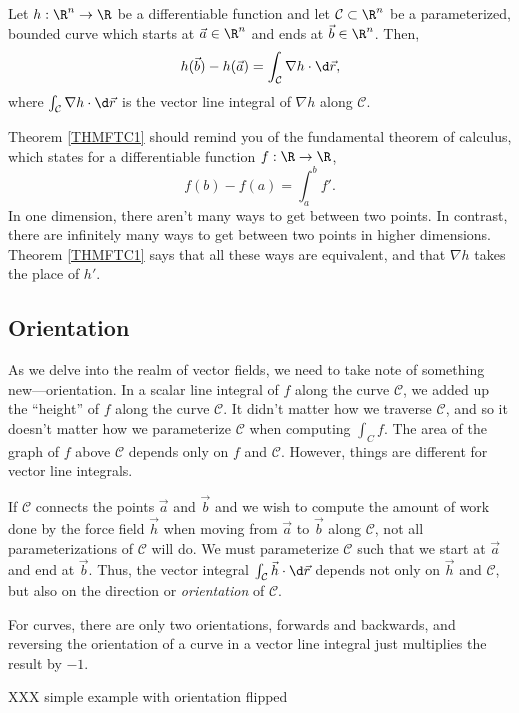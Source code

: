 \begin{theorem}
	\label{THMFTC1}
	Let $h:\R^n\to\R$ be a differentiable function and let
	$\mathcal C\subset \R^n$ be a parameterized, bounded curve 
	which starts at $\vec a\in\R^n$ and ends at $\vec b\in\R^n$.
	Then,
	\[
		h(\vec b)-h(\vec a) = \int_{\mathcal C} \nabla h\cdot \d\vec r,
	\]
	where $\int_{\mathcal C} \nabla h\cdot \d\vec r$ is the vector line
	integral of $\nabla h$ along $\mathcal C$.
\end{theorem}

Theorem \ref{THMFTC1} should remind you of the fundamental theorem of calculus,
which states for a differentiable function $f:\R\to\R$, 
\[
	f(b)-f(a) = \int_a^b f'.
\]
In one dimension, there aren't many ways to get between two points.  In
contrast, there are infinitely many ways to get between two points
in higher dimensions.  Theorem \ref{THMFTC1} says that all these ways
are equivalent, and that $\nabla h$ takes the place of $h'$.

\subsection{Orientation}

As we delve into the realm of vector fields, we need to take note of something
new---orientation.  In a scalar line integral of $f$ along the curve
$\mathcal C$, we added up the ``height'' of $f$ along the curve $\mathcal C$.
It didn't matter how we traverse $\mathcal C$, and so it
doesn't matter how we parameterize $\mathcal C$ when computing $\int_C f$.  
The area of the graph of $f$ above
$\mathcal C$ depends only on $f$ and $\mathcal C$.  However, things are different for
vector line integrals.

If $\mathcal C$ connects the points $\vec a$ and $\vec b$ and we wish to compute
the amount of work done by the force field $\vec h$ when moving from $\vec a$ to
$\vec b$ along $\mathcal C$, not all parameterizations of $\mathcal C$ will
do.  We must parameterize $\mathcal C$ such that we start at $\vec a$ and
end at $\vec b$.  Thus, the vector integral $\int_{\mathcal C} \vec h\cdot \d\vec r$
depends not only on $\vec h$ and $\mathcal C$, but also on the direction
or \emph{orientation} of $\mathcal C$.

For curves, there are only two orientations, forwards and backwards,
and reversing the orientation of a curve in a vector line integral just multiplies
the result by $-1$.

\begin{example}
	XXX simple example with orientation flipped
\end{example}


